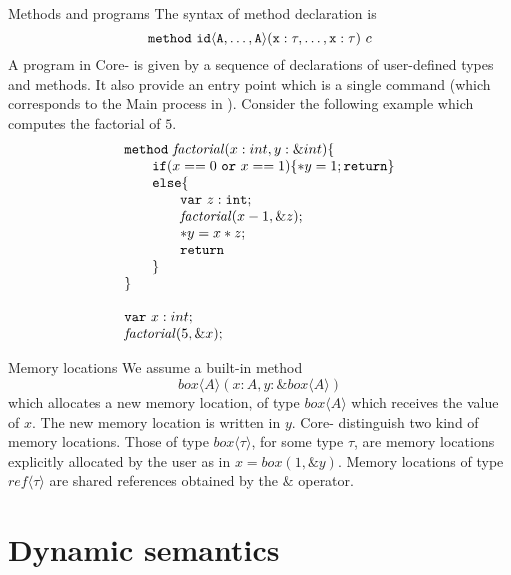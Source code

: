 \documentclass[12pt]{article}
\begin{document}
\begin{paragraph}{Methods and programs}
  The syntax of method declaration is
  $$
    {\tt{method~id\langle A,\ldots,A \rangle(x:\tau,\ldots,x:\tau)}}~c
  $$
  A program in Core-\sail{} is given by a sequence of declarations of user-defined types and methods. It also provide an entry
  point which is a single command (which corresponds to the Main process in \sail{}). Consider the following example which computes
  the factorial of $5$.
  $$
    \begin{array}{l}
      {\tt{method}}~{\mathit{factorial}}(x : int, y:\&int) \{           \\
      \qquad {\tt{if}} (x==0~{\tt{or}}~x==1 ) \{*y = 1; {\tt{return}}\} \\
      \qquad{\tt{else}} \{                                              \\
      \qquad\qquad  {\tt{var}}~z : {\tt{int}};                          \\
      \qquad\qquad  {\mathit{factorial}}(x - 1, \&z);                   \\
      \qquad\qquad  *y = x * z;                                         \\
      \qquad\qquad  {\tt{return}}                                       \\
      \qquad\}                                                          \\
      \}
      \\\\

      {\tt{var}}~x : int;                                               \\
      {\mathit{factorial}} (5, \&x);                                    \\
    \end{array}
  $$
\end{paragraph}

\begin{paragraph}{Memory locations}
  We assume a built-in method
  $$box\langle A\rangle (x:A, y:\&box\langle A\rangle)$$
  which allocates a new memory location, of type $box\langle A\rangle$
  which receives the value of $x$. The new memory location is written in $y$. Core-\sail{} distinguish two kind of
  memory locations. Those of type $box\langle\tau\rangle$, for some type $\tau$, are memory locations explicitly allocated
  by the user as in $x = box(1,\&y)$. Memory locations of type $ref\langle\tau\rangle$ are shared references obtained by
  the $\&$ operator.
\end{paragraph}

\section{Dynamic semantics}

\end{document}

